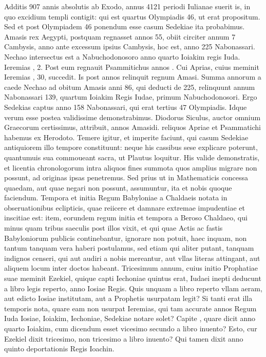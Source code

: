 Additis 907 annis absolutis ab Exodo,
annus 4121 periodi Iulianae suerit is, in quo excidium templi contigit:
qui est quartus Olympiadis 46, ut erat propositum.
Sed et post
Olympiadem 46 ponendum esse casum Sedekiae ita probabimus.
Amasis rex Aegypti, postquam regnasset annos 55, obiit circiter annum
7 Cambysis, anno ante excessum ipsius Cambysis, hoc est, anno
225 Nabonassari.
Nechao intersectus est a Nabuchodonosoro anno
quarto Ioiakim regis Iuda.
Ieremias , 2.
Post eum regnauit
Psammitichus annos .
Cui Aprias, cuius meminit Ieremias
, 30, succedit.
Is post  annos relinquit regnum Amasi.
Summa annorum a caede Nechao ad obitum Amasis anni 86, qui
deducti de 225, relinquunt annum Nabonassari 139, quartum Ioiakim
Regis Iudae, primum Nabuchodonosori.
Ergo Sedekias captus
anno 158 Nabonassari, qui erat tertius 47 Olympiadis.
Idque verum
esse postea validissime demonstrabimus.
Diodorus Siculus,
auctor omnium Graecorum certissimus, attribuit,  annos Amasidi.
reliquos Apriae et Psammatichi habemus ex Herodoto.
Temere
igitur, et imperite faciunt, qui casum Sedekiae antiquiorem illo
tempore constituunt: neque his cassibus sese explicare poterunt,
quantumuis sua commoueant sacra, ut Plautus loquitur.
His valide
demonstratis, et licentia chronologorum intra aliquos fines summota
quos amplius migrare non possunt, ad originas ipsas penetremus.
Sed prius ut in Mathematicis concessa quaedam, aut quae negari
non possunt, assumuntur, ita et nobis quoque faciendum.
Tempora et initia Regum Babyloniae a Chaldaeis notata in obseruationibus
eclipticis, quae reiicere et damnare extremae impudentiae et
inscitiae est: item, eorundem regum initia et tempora a Beroso Chaldaeo,
qui minus quam tribus saeculis post illos vixit, et qui quae Actis
ac fastis Babyloniorum publicis continebantur, ignorare non potuit,
haec inquam, non tantum tanquam vera haberi postulamus, sed etiam
qui aliter putant, tanquam indignos censeri, qui aut audiri a nobis
mereantur, aut vllas literas attingant, aut aliquem locum inter
doctos habeant.
Tricesimum annum, cuius initio Prophatiae suae
meminit Ezekiel, quique capti Iechoniae quintus erat, Iudaei inepti
deducunt a libro legis reperto, anno  Iosiae Regis.
Quis unquam a libro reperto vllam aeram, aut edicto
 Iosiae institutam, aut a
Prophetis usurpatam legit?
Si tanti erat illa temporis nota, quare
eam non usurpat Ieremias, qui tam accurate annos Regum Iuda Iosiae,
Ioiakim, Iechoniae, Sedekiae notare solet?
Capite , quare dicit
anno quarto Ioiakim, cum dicendum esset vicesimo secundo a libro
inuento?
Esto, cur Ezekiel dixit tricesimo, non tricesimo a libro inuento?
Qui tamen dixit anno quinto deportationis Regis Ioachin.

